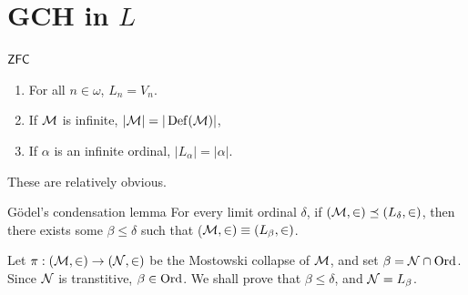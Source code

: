 \documentclass{article}
\begin{document}
\section{GCH in $L$}
\begin{fancylem}{$\mathsf{ZFC}$}
    \hspace{0.1cm} \begin{enumerate}
        \item[(i)] For all $n \in \omega$, $L_{n} = V_{n}$.
        \item[(ii)] If $\mathcal{M}$ is infinite, $|\mathcal{M}| = |\operatorname{Def}(\mathcal{M})|$,
        \item[(iii)] If $\alpha$ is an infinite ordinal, $|L_{\alpha}|=|\alpha|$.
    \end{enumerate}
\end{fancylem}
\proof These are relatively obvious. \endproof
\begin{fancylem}{G\"odel's condensation lemma}
    For every limit ordinal $\delta$, if $(\mathcal{M}, \in) \preceq (L_{\delta}, \in)$, then there exists some $\beta \leq \delta$ such that ($\mathcal{M}, \in) \equiv (L_{\beta},\in)$.
\end{fancylem}
\proof Let $\pi : (\mathcal{M}, \in) \to (\mathcal{N}, \in)$ be the Mostowski collapse of $\mathcal{M}$, and set $\beta = \mathcal{N} \cap \operatorname{Ord}$. Since $\mathcal{N}$ is transtitive, $\beta \in \operatorname{Ord}$. We shall prove that $\beta \leq \delta$, and $\mathcal{N} = L_{\beta}$.\gap
\end{document}
